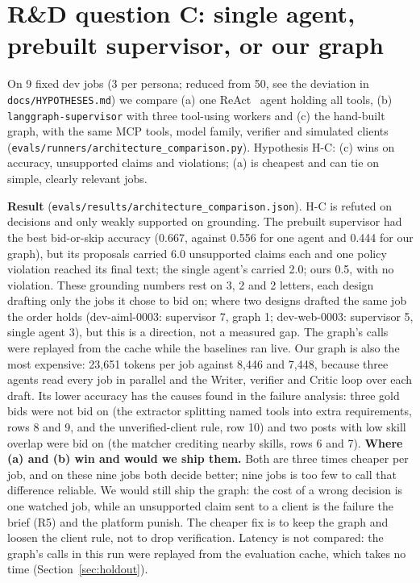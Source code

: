 \documentclass[10pt,a4paper]{article}
\newcommand{\file}[1]{\texttt{\small #1}}
\newcommand{\tablefrom}[2]{\begin{table}[h]\centering\caption{#2}\end{table}}
\begin{document}
\section{R\&D question C: single agent, prebuilt supervisor, or our graph}
On 9 fixed dev jobs (3 per persona; reduced from 50, see the deviation in \file{docs/HYPOTHESES.md}) we compare (a) one ReAct~\cite{yao2023react} agent holding all tools, (b) \texttt{langgraph-}\linebreak[0]\texttt{supervisor} with three
tool-using workers and (c) the hand-built graph, with the same MCP tools, model family, verifier and simulated
clients (\file{evals/runners/architecture\_comparison.py}). Hypothesis H-C: (c) wins on accuracy, unsupported claims
and violations; (a) is cheapest and can tie on simple, clearly relevant jobs.
\tablefrom{architectures}{Architecture comparison on 9 dev jobs.}
\textbf{Result} (\file{evals/results/architecture\_comparison.json}). H-C is refuted on decisions and only weakly
supported on grounding. The prebuilt supervisor had the best bid-or-skip accuracy (0.667, against 0.556 for one agent
and 0.444 for our graph), but its proposals carried 6.0 unsupported claims each and one policy violation reached its
final text; the single agent's carried 2.0; ours 0.5, with no violation. These grounding numbers rest on 3, 2 and 2
letters, each design drafting only the jobs it chose to bid on; where two designs drafted the same job the order holds
(dev-aiml-0003: supervisor 7, graph 1; dev-web-0003: supervisor 5, single agent 3), but this is a direction, not a
measured gap. The graph's calls were replayed from the cache while the baselines ran live. Our graph is also the most expensive: 23,651 tokens per job
against 8,446 and 7,448, because three agents read every job in parallel and the Writer, verifier and Critic loop over
each draft. Its lower accuracy has the causes found in the failure analysis: three gold bids were not bid on (the extractor
splitting named tools into extra requirements, rows 8 and 9, and the unverified-client rule, row 10) and two posts with
low skill overlap were bid on (the matcher crediting nearby skills, rows 6 and 7).
\textbf{Where (a) and (b) win and would we ship them.} Both are three times cheaper per job, and on these nine jobs
both decide better; nine jobs is too few to call that difference reliable. We would still ship the graph: the cost of a wrong decision is one
watched job, while an unsupported claim sent to a client is the failure the brief (R5) and the platform punish. The
cheaper fix is to keep the graph and loosen the client rule, not to drop verification. Latency is not compared: the
graph's calls in this run were replayed from the evaluation cache, which takes no time (Section~\ref{sec:holdout}).
\end{document}
